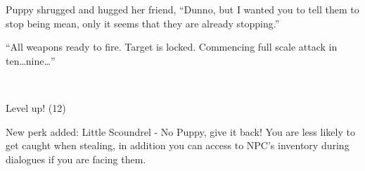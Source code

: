 Puppy shrugged and hugged her friend, ``Dunno, but I wanted you to tell them to stop being mean, only it seems that they are already stopping.''

``{\mt All weapons ready to fire. Target is locked. Commencing full scale attack in ten\dots nine\dots}''

~\vfill

\begin{engnote}
    Level up! (12)
    
    New perk added: Little Scoundrel - No Puppy, give it back! You are less likely to get caught when stealing, in addition you can access to NPC's inventory during dialogues if you are facing them.
\end{engnote}

